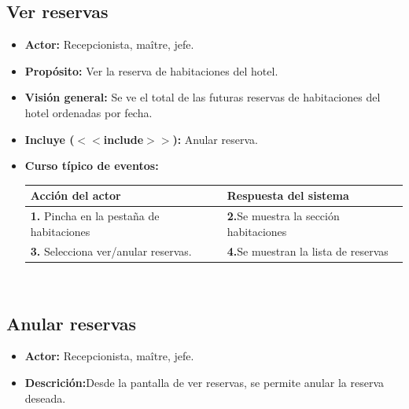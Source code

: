 \documentclass[spanish,a4paper,12pt]{report}	%
\begin{document}
	\subsection{Ver reservas}
		\begin{itemize}
			\item \textbf{Actor:} Recepcionista, maître, jefe.
			\item \textbf{Propósito: } Ver la reserva de habitaciones del hotel.
			\item \textbf{Visión general:} Se ve el total de las futuras reservas de habitaciones del hotel ordenadas por fecha.
			\item \textbf{Incluye ($<<$include$>>$):} Anular reserva.
			\item \textbf{Curso típico de eventos:} 	\\
				\begin{tabular}{|p{6cm}||p{6cm}|}
				\hline
				\textbf{Acción del actor} & \textbf{Respuesta del sistema} \\ \hline
				\textbf{1.} Pincha en la pestaña de habitaciones & \textbf{2.}Se muestra la sección habitaciones \\ \hline 
				\textbf{3.} Selecciona ver/anular reservas. & \textbf{4.}Se muestran la lista de reservas \\ \hline
			\end{tabular}
			\\
		\end {itemize}


	\subsection{Anular reservas}
		\begin{itemize}
			\item \textbf{Actor:} Recepcionista, maître, jefe.
			\item \textbf{Descrición:}Desde la pantalla de ver reservas, se permite anular la reserva deseada. 		
		\end {itemize}

\end{document}
